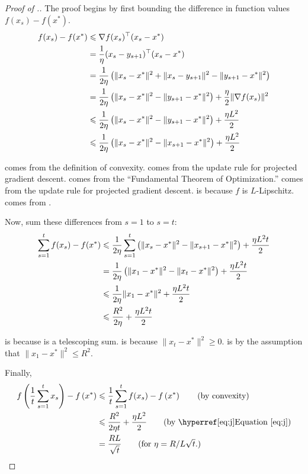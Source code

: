 \begin{proof}[Proof of .]
The proof begins by first bounding the difference in function values $f(x_s) -
f(x^*)$.
%
\begin{align}
    f(x_s) - f(x^*) &\leq \nabla f(x_s)^\trans (x_s - x^*) \equationlabel{a} \\
    &= \frac{1}{\eta}(x_s - y_{s+1})^\trans(x_s - x^*) \equationlabel{b} \\
    &= \frac{1}{2\eta} \left(\lVert x_s - x^* \rVert^2 + \lVert x_s - y_{s+1} \rVert^2 - \lVert y_{s+1} - x^* \rVert^2 \right) \equationlabel{c} \\
    &= \frac{1}{2\eta} \left(\lVert x_s - x^* \rVert^2 - \lVert y_{s+1} - x^* \rVert^2 \right) + \frac{\eta}{2} \lVert \nabla f(x_s) \rVert^2 \equationlabel{d} \\
    &\leq \frac{1}{2\eta} \left(\lVert x_s - x^* \rVert^2 - \lVert y_{s+1} - x^* \rVert^2 \right) + \frac{\eta L^2}{2} \equationlabel{e} \\
    &\leq \frac{1}{2\eta} \left(\lVert x_s - x^* \rVert^2 - \lVert x_{s+1} - x^* \rVert^2 \right) + \frac{\eta L^2}{2} \equationlabel{f}
\end{align}

 comes from the definition of convexity.  comes
from the update rule for projected gradient descent.  comes from
the ``Fundamental Theorem of Optimization.''  comes from the
update rule for projected gradient descent.  is because $f$ is
$L$-Lipschitz. 
comes from .

Now, sum these differences from $s=1$ to $s=t$:
\begin{align}
   \sum_{s=1}^t f(x_s) - f(x^*) &\leq  \frac{1}{2\eta} \sum_{s=1}^t \left(\lVert x_s - x^* \rVert^2 - \lVert x_{s+1} - x^* \rVert^2 \right) + \frac{\eta L^2 t}{2} \equationlabel{g} \\
   &= \frac{1}{2\eta} \left(\lVert x_1 - x^* \rVert^2 - \lVert x_{t} - x^{*} \rVert^2 \right) + \frac{\eta L^2 t}{2} \equationlabel{h} \\
   &\leq \frac{1}{2\eta} \lVert x_1 - x^* \rVert^2 + \frac{\eta L^2 t}{2} \equationlabel{i} \\
   &\leq \frac{R^2}{2\eta} + \frac{\eta L^2 t}{2} \equationlabel{j}
\end{align}

 is because  is a telescoping sum.
 is because $\lVert x_{t} - x^* \rVert^2 \geq 0$.
 is by the assumption that $\lVert x_1 - x^* \rVert^2 \leq R^2$.

Finally,
\begin{align*}
    f\left(\frac{1}{t}\sum_{s=1}^t x_s\right) - f\left(x^*\right)
&\leq \frac{1}{t} \sum_{s=1}^t f(x_s) - f\left(x^*\right) \tag{by convexity} \\
&\leq \frac{R^2}{2\eta t} + \frac{\eta L^2}{2} \tag{by \equationref{j}}\\
&=\frac{RL}{\sqrt{t}} \tag{for $\eta=R/L\sqrt{t}.$}
\end{align*}

\end{proof}

